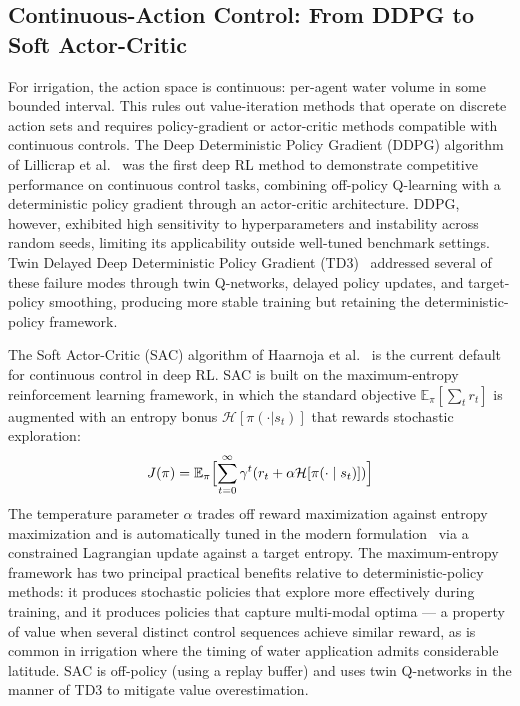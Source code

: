 \subsection{Continuous-Action Control: From DDPG to Soft Actor-Critic}

For irrigation, the action space is continuous: per-agent water
volume in some bounded interval. This rules out value-iteration
methods that operate on discrete action sets and requires
policy-gradient or actor-critic methods compatible with continuous
controls. The Deep Deterministic Policy Gradient (DDPG) algorithm of
Lillicrap et al.~\cite{lillicrap2015ddpg} was the first deep RL method
to demonstrate competitive performance on continuous control tasks,
combining off-policy Q-learning with a deterministic policy gradient
through an actor-critic architecture. DDPG, however, exhibited high
sensitivity to hyperparameters and instability across random seeds,
limiting its applicability outside well-tuned benchmark settings.
Twin Delayed Deep Deterministic Policy Gradient
(TD3)~\cite{fujimoto2018td3} addressed several of these failure modes
through twin Q-networks, delayed policy updates, and target-policy
smoothing, producing more stable training but retaining the
deterministic-policy framework.

The Soft Actor-Critic (SAC) algorithm of Haarnoja et al.\
\cite{haarnoja2018sac,haarnoja2019sac} is the current default for
continuous control in deep RL. SAC is built on the maximum-entropy
reinforcement learning framework, in which the standard objective
$\mathbb{E}_\pi[\sum_t r_t]$ is augmented with an entropy bonus
$\mathcal{H}[\pi(\cdot|s_t)]$ that rewards stochastic exploration:
\begin{equation}
J(\pi) = \mathbb{E}_\pi\Bigl[\sum_{t=0}^{\infty} \gamma^t
(r_t + \alpha \mathcal{H}[\pi(\cdot \mid s_t)])\Bigr]
\label{eq:sac-objective}
\end{equation}
The temperature parameter $\alpha$ trades off reward maximization
against entropy maximization and is automatically tuned in the modern
formulation~\cite{haarnoja2019sac} via a constrained Lagrangian
update against a target entropy. The maximum-entropy framework has
two principal practical benefits relative to deterministic-policy
methods: it produces stochastic policies that explore more
effectively during training, and it produces policies that capture
multi-modal optima --- a property of value when several distinct
control sequences achieve similar reward, as is common in irrigation
where the timing of water application admits considerable latitude.
SAC is off-policy (using a replay buffer) and uses twin Q-networks
in the manner of TD3 to mitigate value overestimation.

